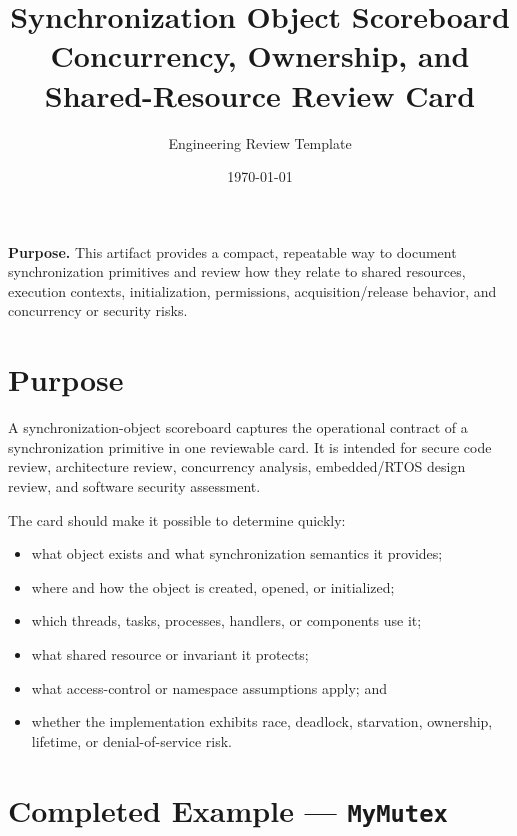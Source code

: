 \documentclass[11pt]{article}
\title{\textbf{Synchronization Object Scoreboard}\\[0.4em]
\large Concurrency, Ownership, and Shared-Resource Review Card}
\author{Engineering Review Template}
\date{\today}
\newcommand{\code}[1]{\texttt{#1}}
\begin{document}
\maketitle

\begin{tcolorbox}[colback=ScoreBlueLight,colframe=ScoreBlue,boxrule=0.6pt,arc=1mm]
\textbf{Purpose.} This artifact provides a compact, repeatable way to document synchronization primitives and review how they relate to shared resources, execution contexts, initialization, permissions, acquisition/release behavior, and concurrency or security risks.
\end{tcolorbox}

\section{Purpose}

A synchronization-object scoreboard captures the operational contract of a synchronization primitive in one reviewable card. It is intended for secure code review, architecture review, concurrency analysis, embedded/RTOS design review, and software security assessment.

The card should make it possible to determine quickly:
\begin{itemize}
  \item what object exists and what synchronization semantics it provides;
  \item where and how the object is created, opened, or initialized;
  \item which threads, tasks, processes, handlers, or components use it;
  \item what shared resource or invariant it protects;
  \item what access-control or namespace assumptions apply; and
  \item whether the implementation exhibits race, deadlock, starvation, ownership, lifetime, or denial-of-service risk.
\end{itemize}

\clearpage
\section{Completed Example --- \code{MyMutex}}
\end{document}
